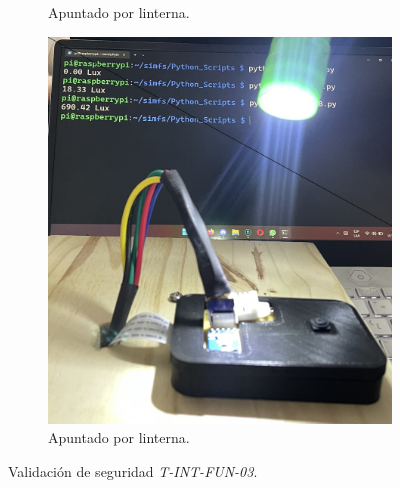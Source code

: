 \begin{figure}[H]
\begin{subfigure}{0.33\textwidth}
        	\caption{Apuntado por linterna.}
        \end{subfigure}
        \begin{subfigure}{0.33\textwidth}
        	\centering
        	\includegraphics[width=\linewidth]{ImagenesValidacion del prototipo/TINTFUN3c}
        	\caption{Apuntado por linterna.}
        \end{subfigure}
	\caption{Validación de seguridad \textit{T-INT-FUN-03}.}
\end{figure}

